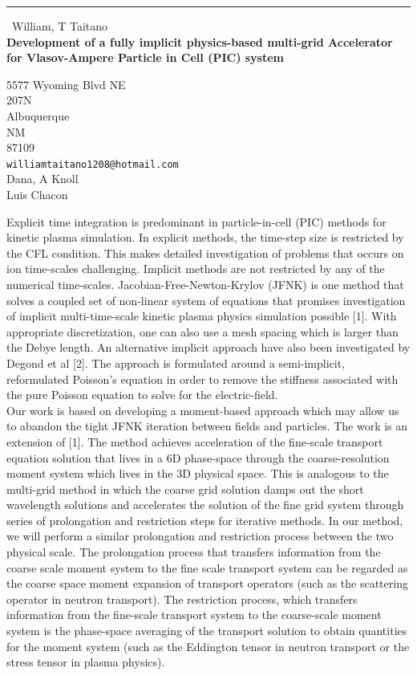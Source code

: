 \documentclass{report}
\begin{document}
\begin{center}
\rule{6in}{1pt} \
{\large William, T Taitano \\
{\bf Development of a fully implicit physics-based multi-grid Accelerator for Vlasov-Ampere Particle in Cell (PIC) system}}

5577 Wyoming Blvd NE \\ 207N \\ Albuquerque \\ NM \\ 87109
\\
{\tt williamtaitano1208@hotmail.com}\\
Dana, A Knoll\\
Luis Chacon\end{center}

\noindent Explicit time integration is predominant in particle-in-cell
(PIC) methods for kinetic plasma
simulation. In explicit methods, the time-step size is restricted by the
CFL condition. This makes
detailed investigation of problems that occurs on ion time-scales
challenging. Implicit methods
are not restricted by any of the numerical time-scales.
Jacobian-Free-Newton-Krylov (JFNK) is one method that solves a coupled
set of non-linear system of equations that promises investigation of
implicit multi-time-scale kinetic plasma physics simulation possible [1].
With appropriate discretization, one can also use a mesh spacing which is
larger than the Debye length. An alternative implicit approach have also
been investigated by Degond et al [2]. The approach is formulated around
a semi-implicit, reformulated Poisson's equation in order to remove the
stiffness associated with the pure Poisson equation to solve for the
electric-field. \\

\noindent Our work is based on developing a moment-based approach which
may allow us to abandon the tight JFNK iteration between fields and
particles. The work is an extension of [1]. The method achieves
acceleration of the fine-scale transport equation solution that lives in
a 6D phase-space through the coarse-resolution moment system which lives
in the 3D physical space. This is analogous to the multi-grid method in
which the coarse grid solution damps out the short wavelength solutions
and accelerates the solution of the fine grid system through series of
prolongation and restriction steps for iterative methods. In our method,
we will perform a similar prolongation and restriction process between
the two physical scale. The prolongation process that transfers
information from the coarse scale moment system to the fine scale
transport system can be regarded as the coarse space moment expansion of
transport operators (such as the scattering operator in neutron
transport). The restriction process, which transfers information from the
fine-scale transport system to the coarse-scale moment system is the
phase-space averaging of the transport solution to obtain quantities for
the moment system (such as the Eddington tensor in neutron transport or
the stress tensor in plasma physics). \\
\end{document}
